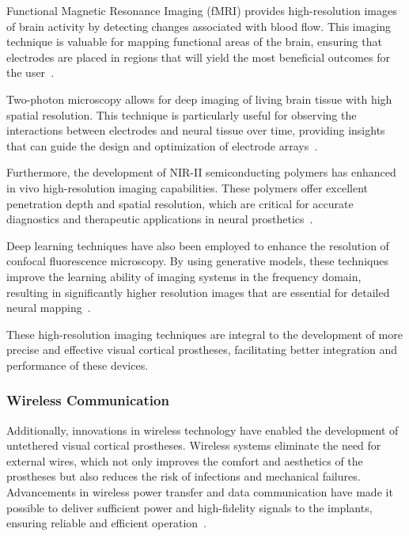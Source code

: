 \documentclass[twocolumn,10pt]{article}
\begin{document}
Functional Magnetic Resonance Imaging (fMRI) provides high-resolution images of
brain activity by detecting changes associated with blood flow. This imaging
technique is valuable for mapping functional areas of the brain, ensuring that
electrodes are placed in regions that will yield the most beneficial outcomes
for the user~\cite{landelleInvestigatingHumanSpinal2021}.

Two-photon microscopy allows for deep imaging of living brain tissue with high
spatial resolution. This technique is particularly useful for observing the
interactions between electrodes and neural tissue over time, providing insights
that can guide the design and optimization of electrode
arrays~\cite{yangIntegratedMicroprismMicroelectrode}.

Furthermore, the development of NIR-II semiconducting polymers has enhanced in
vivo high-resolution imaging capabilities. These polymers offer excellent
penetration depth and spatial resolution, which are critical for accurate
diagnostics and therapeutic applications in neural prosthetics~\cite{wangRecentProgressSecond2023,kangNIRIISemiconductingPolymers2023}.

Deep learning techniques have also been employed to enhance the resolution of
confocal fluorescence microscopy. By using generative models, these techniques
improve the learning ability of imaging systems in the frequency domain,
resulting in significantly higher resolution images that are essential for
detailed neural mapping~\cite{huangEnhancingImageResolution2023}.

These high-resolution imaging techniques are integral to the development of more
precise and effective visual cortical prostheses, facilitating better
integration and performance of these devices.

\subsubsection*{Wireless Communication}
Additionally, innovations in wireless technology have enabled the development of
untethered visual cortical prostheses. Wireless systems eliminate the need for
external wires, which not only improves the comfort and aesthetics of the
prostheses but also reduces the risk of infections and mechanical failures.
Advancements in wireless power transfer and data communication have made it
possible to deliver sufficient power and high-fidelity signals to the implants,
ensuring reliable and efficient
operation~\cite{rosenfeldTissueResponseChronically2020}.
\end{document}

